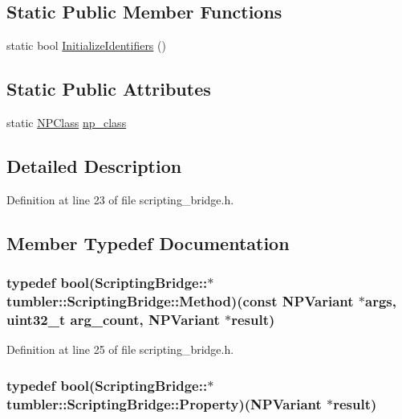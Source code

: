 \subsection*{Static Public Member Functions}
\begin{DoxyCompactItemize}
\item 
static bool \hyperlink{classtumbler_1_1_scripting_bridge_a9653f59bae05d24f2f319a2764a7ce61}{InitializeIdentifiers} ()
\end{DoxyCompactItemize}
\subsection*{Static Public Attributes}
\begin{DoxyCompactItemize}
\item 
static \hyperlink{struct_n_p_class}{NPClass} \hyperlink{classtumbler_1_1_scripting_bridge_a4cd00d35febde2739ee85287f39981ac}{np\_\-class}
\end{DoxyCompactItemize}


\subsection{Detailed Description}


Definition at line 23 of file scripting\_\-bridge.h.



\subsection{Member Typedef Documentation}
\hypertarget{classtumbler_1_1_scripting_bridge_addb1badb0e891b38c6d90767342b5bb3}{
\subsubsection[{Method}]{\setlength{\rightskip}{0pt plus 5cm}typedef bool(ScriptingBridge::$\ast$ {\bf tumbler::ScriptingBridge::Method})(const {\bf NPVariant} $\ast$args, uint32\_\-t arg\_\-count, {\bf NPVariant} $\ast$result)}}
\label{classtumbler_1_1_scripting_bridge_addb1badb0e891b38c6d90767342b5bb3}


Definition at line 25 of file scripting\_\-bridge.h.

\hypertarget{classtumbler_1_1_scripting_bridge_ad7507ce0e5c8f49fde790c743447f3c3}{
\subsubsection[{Property}]{\setlength{\rightskip}{0pt plus 5cm}typedef bool(ScriptingBridge::$\ast$ {\bf tumbler::ScriptingBridge::Property})({\bf NPVariant} $\ast$result)}}
\label{classtumbler_1_1_scripting_bridge_ad7507ce0e5c8f49fde790c743447f3c3}


